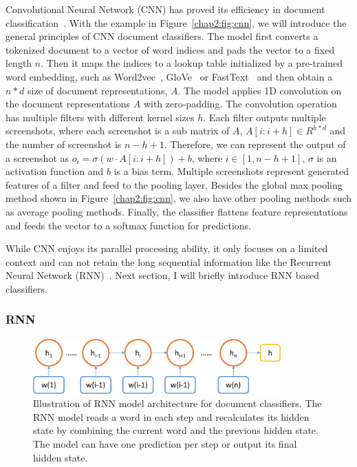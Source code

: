 Convolutional Neural Network (CNN) has proved its efficiency in document classification~\cite{kim2014convolutional}. 
With the example in Figure~\ref{chap2:fig:cnn}, we will introduce the general principles of CNN document classifiers.
The model first converts a tokenized document to a vector of word indices and pads the vector to a fixed length $n$. 
Then it maps the indices to a lookup table initialized by a pre-trained word embedding, such as Word2vec~\cite{mikolov2013distributed}, GloVe~\cite{pennington2014glove} or FastText~\cite{bojanowski2017enriching} and then obtain a $n*d$ size of document representations, $A$.
The model applies 1D convolution on the document representations $A$ with zero-padding.
The convolution operation has multiple filters with different kernel sizes $h$.
Each filter outputs multiple screenshots, where each screenshot is a sub matrix of $A$, $A[i: i+h] \in R^{h*d}$ and the number of screenshot is $n-h+1$.
Therefore, we can represent the output of a screenshot as $o_i = \sigma(w \cdot A[i:i+h]) + b$, where $i \in [1, n-h+1]$, $\sigma$ is an activation function and $b$ is a bias term.
Multiple screenshots represent generated features of a filter and feed to the pooling layer.
Besides the global max pooling method shown in Figure~\ref{chap2:fig:cnn}, we also have other pooling methods such as average pooling methods.
Finally, the classifier flattens feature representations and feeds the vector to a softmax function for predictions.

While CNN enjoys its parallel processing ability, it only focuses on a limited context and can not retain the long sequential information like the Recurrent Neural Network (RNN)~\cite{goodfellow2016deep}. Next section, I will briefly introduce RNN based classifiers.


\subsubsection{RNN}

\begin{figure}[htp]
\centering
\includegraphics[width=0.85\textwidth]{images/chapter2/rnn.pdf}
\caption{Illustration of RNN model architecture for document classifiers. The RNN model reads a word in each step and recalculates its hidden state by combining the current word and the previous hidden state. The model can have one prediction per step or output its final hidden state.}
\label{chap2:fig:rnn}
\end{figure}

